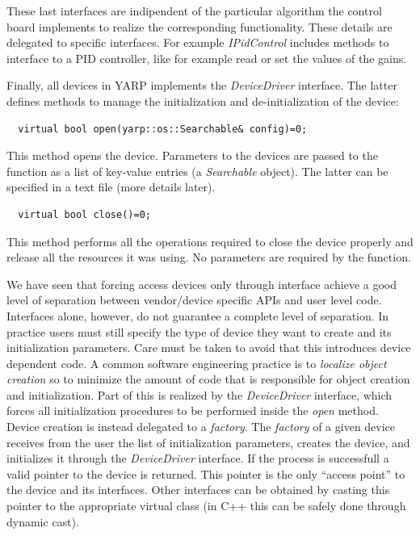 These last interfaces are indipendent of the particular algorithm the control
board implements to realize the corresponding functionality. These details are 
delegated to specific interfaces. For example \emph{IPidControl} includes methods to 
interface to a PID controller, like for example read or set the values of the gains.

Finally, all devices in YARP implements the \emph{DeviceDriver} interface. 
The latter defines methods to manage the initialization and de-initialization of 
the device: 

\begin{verbatim}
  virtual bool open(yarp::os::Searchable& config)=0;
\end{verbatim}

This method opens the device. Parameters to the devices are passed to the
function as a list of key-value entries (a \emph{Searchable} object). The latter 
can be specified in a text file (more details later).

\begin{verbatim}
  virtual bool close()=0;
\end{verbatim}

This method performs all the operations required to close the 
device properly and release all the resources it was using. No
parameters are required by the function.

We have seen that forcing access devices only through 
interface achieve a good level of separation between vendor/device specific APIs and 
user level code. Interfaces alone, however, do not guarantee a complete level of 
separation. In practice users must still specify the type of device they 
want to create and its initialization parameters. Care must be taken to avoid that 
this introduces device dependent code. A common software engineering practice is to 
\emph{localize object creation} so to minimize the amount of code that is responsible
for object creation and initialization. Part of this is realized by the 
\emph{DeviceDriver} interface, which forces all initialization procedures to be 
performed inside the \emph{open} method. Device creation is instead delegated to 
a \emph{factory}. The \emph{factory} of a given device receives from the user 
the list of initialization parameters, creates the device, and initializes it 
through the \emph{DeviceDriver} interface. If the process is successfull 
a valid pointer to the device is returned. This pointer is the only 
``access point'' to the device and its interfaces. Other interfaces can be 
obtained by casting this pointer to the appropriate virtual class (in C++ this 
can be safely done through dynamic cast). 


